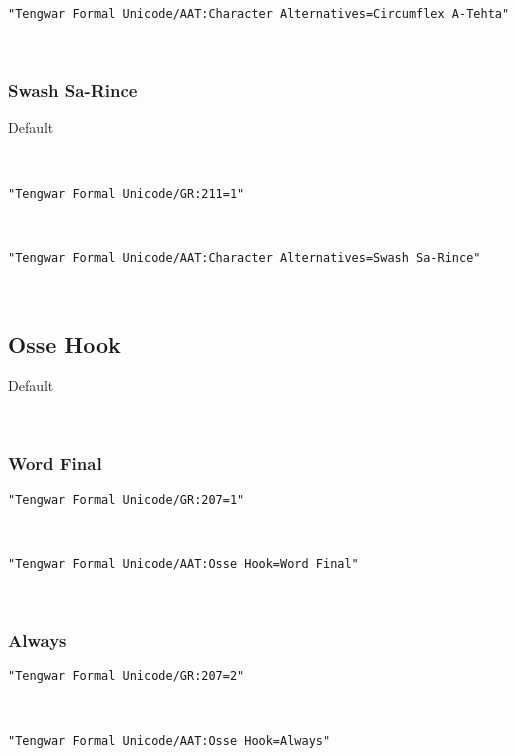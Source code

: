 \documentclass[11pt,a4paper]{article}
\begin{document}
\noindent \texttt{"Tengwar Formal Unicode/AAT:Character Alternatives=Circumflex A-Tehta"}

\formalAATcircumflex  \normalfont



\subsubsection{Swash Sa-Rince}


Default

\formalGR 

\noindent\texttt{"Tengwar Formal Unicode/GR:211=1"}

\formalGRswash 

\noindent \texttt{"Tengwar Formal Unicode/AAT:Character Alternatives=Swash Sa-Rince"}

\formalAATswash  \normalfont



\subsection{Osse Hook}


Default

\formalGR  \normalfont



\subsubsection*{Word Final}


\texttt{"Tengwar Formal Unicode/GR:207=1"}

\formalGRossefinal 

\noindent \texttt{"Tengwar Formal Unicode/AAT:Osse Hook=Word Final"}

\formalAATossefinal 



\subsubsection*{Always}


\texttt{"Tengwar Formal Unicode/GR:207=2"}

\formalGRossealways 

\noindent \texttt{"Tengwar Formal Unicode/AAT:Osse Hook=Always"}

\formalAATossealways  \normalfont
\end{document}
